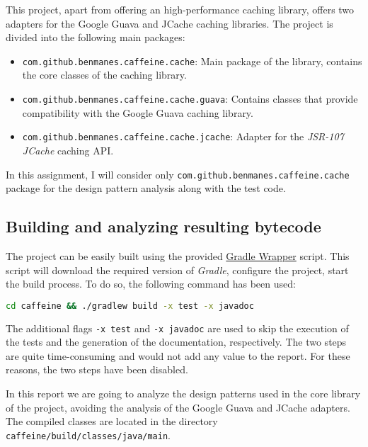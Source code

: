 This project, apart from offering an high-performance caching library, offers two adapters for the Google Guava and JCache caching libraries. The project is divided into the following main packages:

\begin{itemize}
	\item \texttt{com.github.benmanes.caffeine.cache}: Main package of the library, contains the core classes of the caching library.
	\item \texttt{com.github.benmanes.caffeine.cache.guava}: Contains classes that provide compatibility with the Google Guava caching library. \cite{caffeine:guava}
	\item \texttt{com.github.benmanes.caffeine.cache.jcache}: Adapter for the \textit{JSR-107 JCache} caching API. \cite{caffeine:jcache}
\end{itemize}

\noindent In this assignment, I will consider only \texttt{com.github.benmanes.caffeine.cache} package for the design pattern analysis along with the test code.

\subsection{Building and analyzing resulting bytecode}
\label{sec:building}

The project can be easily built using the provided \href{https://docs.gradle.org/current/userguide/gradle_wrapper.html}{Gradle Wrapper} script. This script will download the required version of \textit{Gradle}, configure the project, start the build process. To do so, the following command has been used:

\begin{lstlisting}[language=bash, caption={Building the Caffeine project with Gradle}]
              cd caffeine && ./gradlew build -x test -x javadoc
\end{lstlisting}

\noindent The additional flags \texttt{-x test} and \texttt{-x javadoc} are used to skip the execution of the tests and the generation of the documentation, respectively. The two steps are quite time-consuming and would not add any value to the report. For these reasons, the two steps have been disabled.

In this report we are going to analyze the design patterns used in the core library of the project, avoiding the analysis of the Google Guava and JCache adapters. The compiled classes are located in the directory \texttt{caffeine/build/classes/java/main}.


